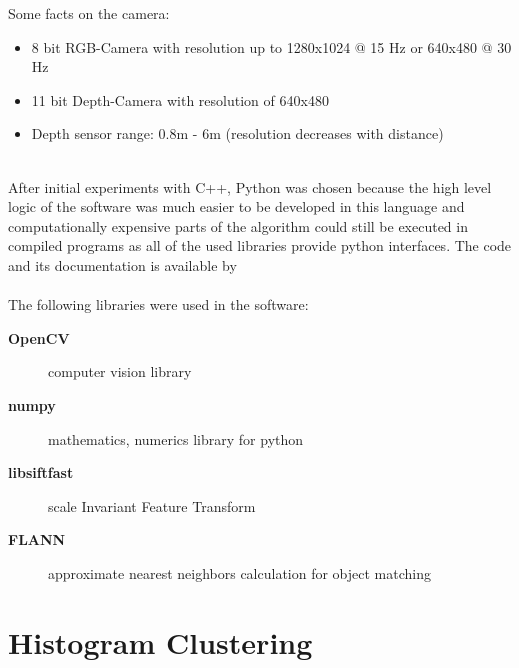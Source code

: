 Some facts on the camera:
\begin{itemize}
    \item 8 bit RGB-Camera with resolution up to 1280x1024 @ 15 Hz or 640x480 @ 30 Hz
    \item 11 bit Depth-Camera with resolution of 640x480
    \item Depth sensor range: 0.8m - 6m (resolution decreases with distance)
\end{itemize} \\
After initial experiments with C++, Python was chosen because the high level logic of the software was much easier to be developed in this language and computationally expensive parts of the algorithm could still be executed in compiled programs as all of the used libraries provide python interfaces.
The code and its documentation is available by \cite{gabler:2011}\\ \\
The following libraries were used in the software:
\begin{description}
    \item[\textbf{OpenCV}] computer vision library
    \item[\textbf{numpy}] mathematics, numerics library for python
    \item[\textbf{libsiftfast}] scale Invariant Feature Transform
    \item[\textbf{FLANN}] approximate nearest neighbors calculation for object matching
\end{description}


\clearpage
\section{Histogram Clustering} %
\label{sg:sec:histogram_clustering}


